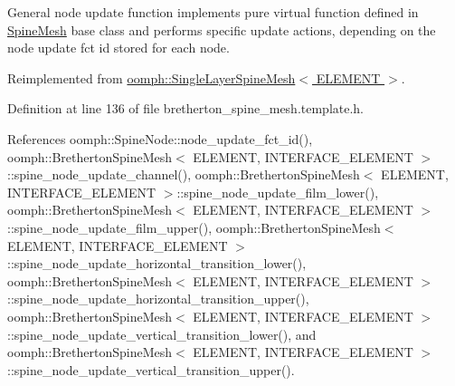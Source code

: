 General node update function implements pure virtual function defined in \hyperlink{classoomph_1_1SpineMesh}{Spine\+Mesh} base class and performs specific update actions, depending on the node update fct id stored for each node. 



Reimplemented from \hyperlink{classoomph_1_1SingleLayerSpineMesh_a364648c15ab29c0c8d1cf7c2bc4cb792}{oomph\+::\+Single\+Layer\+Spine\+Mesh$<$ E\+L\+E\+M\+E\+N\+T $>$}.



Definition at line 136 of file bretherton\+\_\+spine\+\_\+mesh.\+template.\+h.



References oomph\+::\+Spine\+Node\+::node\+\_\+update\+\_\+fct\+\_\+id(), oomph\+::\+Bretherton\+Spine\+Mesh$<$ E\+L\+E\+M\+E\+N\+T, I\+N\+T\+E\+R\+F\+A\+C\+E\+\_\+\+E\+L\+E\+M\+E\+N\+T $>$\+::spine\+\_\+node\+\_\+update\+\_\+channel(), oomph\+::\+Bretherton\+Spine\+Mesh$<$ E\+L\+E\+M\+E\+N\+T, I\+N\+T\+E\+R\+F\+A\+C\+E\+\_\+\+E\+L\+E\+M\+E\+N\+T $>$\+::spine\+\_\+node\+\_\+update\+\_\+film\+\_\+lower(), oomph\+::\+Bretherton\+Spine\+Mesh$<$ E\+L\+E\+M\+E\+N\+T, I\+N\+T\+E\+R\+F\+A\+C\+E\+\_\+\+E\+L\+E\+M\+E\+N\+T $>$\+::spine\+\_\+node\+\_\+update\+\_\+film\+\_\+upper(), oomph\+::\+Bretherton\+Spine\+Mesh$<$ E\+L\+E\+M\+E\+N\+T, I\+N\+T\+E\+R\+F\+A\+C\+E\+\_\+\+E\+L\+E\+M\+E\+N\+T $>$\+::spine\+\_\+node\+\_\+update\+\_\+horizontal\+\_\+transition\+\_\+lower(), oomph\+::\+Bretherton\+Spine\+Mesh$<$ E\+L\+E\+M\+E\+N\+T, I\+N\+T\+E\+R\+F\+A\+C\+E\+\_\+\+E\+L\+E\+M\+E\+N\+T $>$\+::spine\+\_\+node\+\_\+update\+\_\+horizontal\+\_\+transition\+\_\+upper(), oomph\+::\+Bretherton\+Spine\+Mesh$<$ E\+L\+E\+M\+E\+N\+T, I\+N\+T\+E\+R\+F\+A\+C\+E\+\_\+\+E\+L\+E\+M\+E\+N\+T $>$\+::spine\+\_\+node\+\_\+update\+\_\+vertical\+\_\+transition\+\_\+lower(), and oomph\+::\+Bretherton\+Spine\+Mesh$<$ E\+L\+E\+M\+E\+N\+T, I\+N\+T\+E\+R\+F\+A\+C\+E\+\_\+\+E\+L\+E\+M\+E\+N\+T $>$\+::spine\+\_\+node\+\_\+update\+\_\+vertical\+\_\+transition\+\_\+upper().

\mbox{\label{classoomph_1_1BrethertonSpineMesh_a5a09b6d2f5e7ffd12a0ae882754ad818}} 
